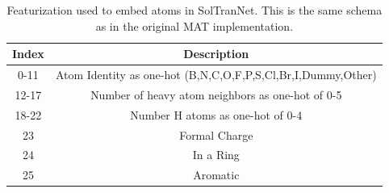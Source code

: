 \documentclass[journal=jcisd8,manuscript=article]{achemso}
\begin{document}
\begin{table}
    \begin{tabular}{|c|c|}
        \hline
         Index & Description \\
         \hline
         0-11 & Atom Identity as one-hot (B,N,C,O,F,P,S,Cl,Br,I,Dummy,Other) \\
         12-17 & Number of heavy atom neighbors as one-hot of 0-5 \\
         18-22 & Number H atoms as one-hot of 0-4 \\
         23 & Formal Charge \\
         24 & In a Ring \\
         25 & Aromatic \\
         \hline
    \end{tabular}
    \caption{Featurization used to embed atoms in SolTranNet. This is the same schema as in the original MAT implementation. }
    \label{tab:atomembed}
\end{table}
\end{document}
